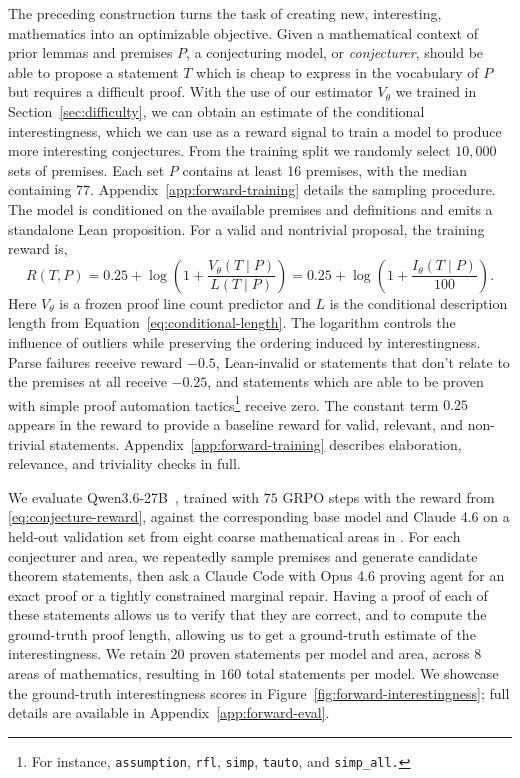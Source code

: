 The preceding construction turns the task of creating new, interesting, mathematics into an optimizable objective.
%
Given a mathematical context of prior lemmas and premises $P$, a conjecturing model, or \emph{conjecturer}, should be able to propose a statement $T$ which is cheap to express in the vocabulary of $P$ but requires a difficult proof.
%
With the use of our estimator $V_\theta$ we trained in Section~\ref{sec:difficulty}, we can obtain an estimate of the conditional interestingness, which we can use as a reward signal to train a model to produce more interesting conjectures.
%
From the \Mathlib training split we randomly select $10{,}000$ sets of premises. Each set $P$ contains at least 16 premises, with the median containing $77$. Appendix~\ref{app:forward-training} details the sampling procedure.
%
The model is conditioned on the available premises and definitions and emits a standalone Lean proposition. For a valid and nontrivial proposal, the training reward is,
\begin{equation}
  R(T,P)=0.25+\log\!\left(1+\frac{V_\theta(T\mid P)}{L(T\mid P)}\right)
  =0.25+\log\!\left(1+\frac{I_\theta(T\mid P)}{100}\right).
  \label{eq:conjecture-reward}
\end{equation}
Here $V_\theta$ is a frozen proof line count predictor and $L$ is the conditional description length from Equation~\ref{eq:conditional-length}.
%
The logarithm controls the influence of outliers while preserving the ordering induced by interestingness.
%
Parse failures receive reward $-0.5$, Lean-invalid or statements that don't relate to the premises at all receive $-0.25$, and statements which are able to be proven with simple proof automation tactics\footnote{For instance,  \texttt{assumption}, \texttt{rfl}, \texttt{simp}, \texttt{tauto}, and \texttt{simp\_all.}} receive zero. 
%
The constant term $0.25$ appears in the reward to provide a baseline reward for valid, relevant, and non-trivial statements.
%
Appendix~\ref{app:forward-training} describes elaboration, relevance, and triviality checks in full.

We evaluate Qwen3.6-27B~\citep{qwen2026qwen36}, trained with $75$ GRPO steps with the reward from \eqref{eq:conjecture-reward}, against the corresponding base model and Claude 4.6 on a held-out validation set from eight coarse mathematical areas in \Mathlib.
%
For each conjecturer and area, we repeatedly sample premises and generate candidate theorem statements, then ask a Claude Code with Opus 4.6 proving agent for an exact proof or a tightly constrained marginal repair.
%
Having a proof of each of these statements allows us to verify that they are correct, and to compute the ground-truth proof length, allowing us to get a ground-truth estimate of the interestingness. 
%
We retain $20$ proven statements per model and area, across 8 areas of mathematics, resulting in $160$ total statements per model. 
%
We showcase the ground-truth interestingness scores in Figure~\ref{fig:forward-interestingness};  full details are available in Appendix~\ref{app:forward-eval}.

